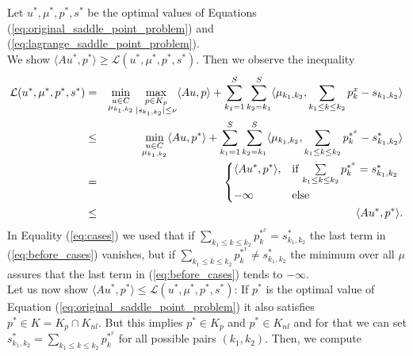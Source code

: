 \documentclass[abstracton]{scrreprt}
\newenvironment{proof}[1][Proof]{\begin{trivlist}
\item[\hskip \labelsep {\bfseries #1}]}{\end{trivlist}}
\begin{document}
            \begin{proof}
                Let $u^{\ast}, \mu^{\ast}, p^{\ast}, s^{\ast}$ be the optimal values of Equations (\ref{eq:original_saddle_point_problem}) and (\ref{eq:lagrange_saddle_point_problem}).\\
                We show $\langle Au^{\ast}, p^{\ast} \rangle \ge \mathcal{L}(u^{\ast}, \mu^{\ast}, p^{\ast}, s^{\ast})$. Then we observe the inequality
                    \begin{eqnarray}
                        \mathcal{L}(u^{\ast}, \mu^{\ast}, p^{\ast}, s^{\ast}) &=& \min_{\substack{u \in C \\ \mu_{k_{1}, k_{2}}}} \max_{\substack{p \in K_{p} \\ |s_{k_{1}, k_{2}}| \le \nu}} \langle Au, p \rangle + \sum_{k_{1} = 1}^{S} \sum_{k_{2} = k_{1}}^{S} \langle \mu_{k_{1}, k_{2}}, \sum_{k_{1} \le k \le k_{2}} p^{x}_{k} - s_{k_{1}, k_{2}} \rangle \notag \\
                        &\le& \min_{\substack{u \in C \\ \mu_{k_{1}, k_{2}}}} \langle Au, p^{\ast} \rangle + \sum_{k_{1} = 1}^{S} \sum_{k_{2} = k_{1}}^{S} \langle \mu_{k_{1}, k_{2}}, \sum_{k_{1} \le k \le k_{2}} p^{\ast^{x}}_{k} - s^{\ast}_{k_{1}, k_{2}} \rangle \label{eq:before_cases} \\
                        &=& \begin{dcases*}
                            \langle Au^{\ast}, p^{\ast} \rangle, & \textnormal{if $\sum\limits_{k_{1} \le k \le k_{2}} p^{\ast^{x}}_{k} = s^{\ast}_{k_{1}, k_{2}}$} \\
                            -\infty & \textnormal{else}
                        \end{dcases*} \label{eq:cases} \\
                        &\le& \langle Au^{\ast}, p^{\ast} \rangle. \notag
                    \end{eqnarray}
                In Equality (\ref{eq:cases}) we used that if $\sum_{k_{1} \le k \le k_{2}} p^{\ast^{x}}_{k} = s^{\ast}_{k_{1}, k_{2}}$ the last term in (\ref{eq:before_cases}) vanishes, but if $\sum_{k_{1} \le k \le k_{2}} p^{\ast^{x}}_{k} \neq s^{\ast}_{k_{1}, k_{2}}$ the minimum over all $\mu$ assures that the last term in (\ref{eq:before_cases}) tends to $-\infty$.\\
                Let us now show $\langle Au^{\ast}, p^{\ast} \rangle \le \mathcal{L}(u^{\ast}, \mu^{\ast}, p^{\ast}, s^{\ast})$: If $p^{\ast}$ is the optimal value of Equation (\ref{eq:original_saddle_point_problem}) it also satisfies $p^{\ast} \in K = K_{p} \cap K_{nl}$. But this implies $p^{\ast} \in K_{p}$ and $p^{\ast} \in K_{nl}$ and for that we can set $s^{\ast}_{k_{1}, k_{2}} = \sum_{k_{1} \le k \le k_{2}} p^{\ast^{x}}_{k}$ for all possible pairs $(k_{1}, k_{2})$. Then, we compute

\end{proof}
\end{document}
